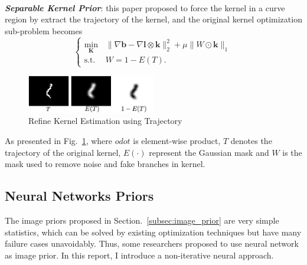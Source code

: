 \documentclass[journal, onecolumn, 10pt]{IEEEtran}
\begin{document}
~\\
\textbf{\emph{Separable Kernel Prior}}\cite{fang2014separable}: this paper proposed to force the kernel in a curve region by extract the trajectory of the kernel, and the original kernel optimization sub-problem becomes
\begin{equation}
\begin{cases}
\min_{\mathbf{K}} &\|\nabla\mathbf{b} - \nabla\mathbf{l} \otimes \mathbf{k} \|_2^2 + \mu \|W \odot \mathbf{k} \|_1 \\
\text{s.t.}~~ &W = 1 - E(T).
\end{cases}
\label{eqn:normalized_sparsity_alter}
\end{equation}
\begin{figure}[h!]
\centering
\includegraphics[width = 0.5\textwidth]{pic/separable_kernel.png}
\caption{Refine Kernel Estimation using Trajectory}
\label{fig:separable_kernel}
\end{figure}

As presented in Fig.~\ref{fig:separable_kernel}, where $odot$ is element-wise product, $T$ denotes the trajectory of the original kernel, $E(\cdot)$ represent the Gaussian mask and $W$ is the mask used to remove noise and fake branches in kernel.

\subsection{Neural Networks Priors}
\label{subsec:neural_network_prior}
The image priors proposed in Section.~\ref{subsec:image_prior} are very simple statistics, which can be solved by existing optimization techniques but have many failure cases unavoidably. Thus, some researchers proposed to use neural network as image prior. In this report, I introduce a non-iterative neural approach.
\end{document}
